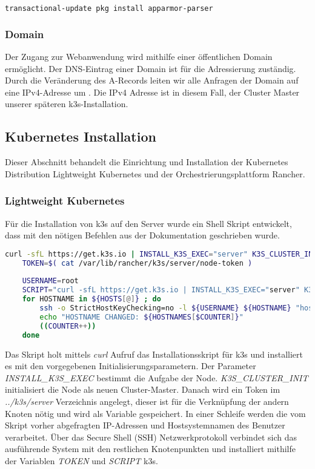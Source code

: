 \begin{lstlisting}[caption={apparmor-parser command},captionpos=b,label={lst:apparmor},language=bash]
transactional-update pkg install apparmor-parser
\end{lstlisting}

\subsubsection{Domain}
Der Zugang zur Webanwendung wird mithilfe einer öffentlichen Domain ermöglicht.
Der DNS-Eintrag einer Domain ist für die Adressierung zuständig.
Durch die Veränderung des A-Records leiten wir alle Anfragen der Domain auf eine IPv4-Adresse um \cite{LearningCoreDNS}.
Die IPv4 Adresse ist in diesem Fall, der Cluster Master unserer späteren k3s-Installation.

\subsection{Kubernetes Installation}
Dieser Abschnitt behandelt die Einrichtung und Installation der Kubernetes Distribution Lightweight Kubernetes und der Orchestrierungsplattform Rancher.


\subsubsection{Lightweight Kubernetes}\label{k3screate}
Für die Installation von k3s auf den Server wurde ein Shell Skript entwickelt, 
dass mit den nötigen Befehlen aus der Dokumentation geschrieben wurde.
\begin{lstlisting}[caption={Ausschnitt des installk3s.sh Skripts},captionpos=b,label={lst:k3sintall},language=bash]
    curl -sfL https://get.k3s.io | INSTALL_K3S_EXEC="server" K3S_CLUSTER_INIT=1 sh -
    TOKEN=$( cat /var/lib/rancher/k3s/server/node-token )
    
    USERNAME=root
    SCRIPT="curl -sfL https://get.k3s.io | INSTALL_K3S_EXEC="server" K3S_TOKEN=$TOKEN K3S_URL=https://$ip4:6443 sh - "
    for HOSTNAME in ${HOSTS[@]} ; do
        ssh -o StrictHostKeyChecking=no -l ${USERNAME} ${HOSTNAME} "hostnamectl set-hostname ${HOSTNAMES[$COUNTER]}; ${SCRIPT}"  
        echo "HOSTNAME CHANGED: ${HOSTNAMES[$COUNTER]}"
        ((COUNTER++))
    done
\end{lstlisting}

Das Skript holt mittels \textit{curl} Aufruf das Installationsskript für k3s und installiert es mit den vorgegebenen Initialisierungsparametern. 
Der Parameter \textit{INSTALL\_K3S\_EXEC} bestimmt die Aufgabe der Node.
\textit{K3S\_CLUSTER\_INIT} initialisiert die Node als neuen Cluster-Master.
Danach wird ein Token im \textit{../k3s/server} Verzeichnis angelegt, dieser ist für die Verknüpfung der andern Knoten nötig und wird als Variable gespeichert.
In einer Schleife werden die vom Skript vorher abgefragten IP-Adressen und Hostsystemnamen des Benutzer verarbeitet.
Über das Secure Shell (SSH) Netzwerkprotokoll verbindet sich das ausführende System mit den restlichen Knotenpunkten
und installiert mithilfe der Variablen \textit{TOKEN} und \textit{SCRIPT} k3s.

